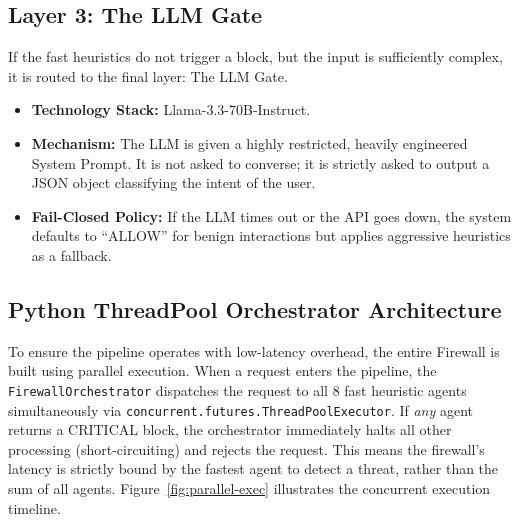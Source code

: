 \documentclass[12pt,a4paper]{article}
\begin{document}
\subsection{Layer 3: The LLM Gate}

If the fast heuristics do not trigger a block, but the input is sufficiently complex, it is routed to the final layer: The LLM Gate.
\begin{itemize}
    \item \textbf{Technology Stack:} Llama-3.3-70B-Instruct.
    \item \textbf{Mechanism:} The LLM is given a highly restricted, heavily engineered System Prompt. It is not asked to converse; it is strictly asked to output a JSON object classifying the intent of the user.
    \item \textbf{Fail-Closed Policy:} If the LLM times out or the API goes down, the system defaults to ``ALLOW'' for benign interactions but applies aggressive heuristics as a fallback.
\end{itemize}

\subsection{Python ThreadPool Orchestrator Architecture}

To ensure the pipeline operates with low-latency overhead, the entire Firewall is built using parallel execution. When a request enters the pipeline, the \texttt{FirewallOrchestrator} dispatches the request to all 8 fast heuristic agents simultaneously via \texttt{concurrent.futures.ThreadPoolExecutor}. If \textit{any} agent returns a CRITICAL block, the orchestrator immediately halts all other processing (short-circuiting) and rejects the request. This means the firewall's latency is strictly bound by the fastest agent to detect a threat, rather than the sum of all agents. Figure~\ref{fig:parallel-exec} illustrates the concurrent execution timeline.
\end{document}
